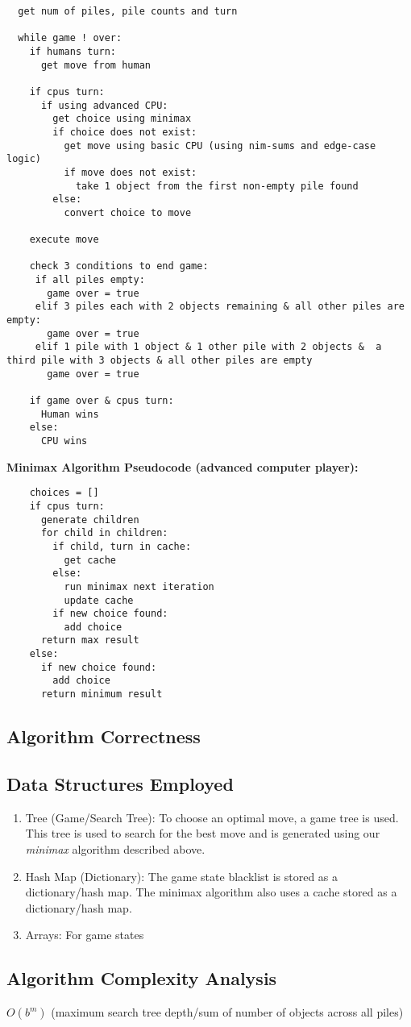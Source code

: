 \documentclass{article}
\begin{document}
\begin{verbatim}
  get num of piles, pile counts and turn
  
  while game ! over:
    if humans turn:
      get move from human
      
    if cpus turn:
      if using advanced CPU:
      	get choice using minimax
      	if choice does not exist:
      	  get move using basic CPU (using nim-sums and edge-case logic)
      	  if move does not exist:
      	    take 1 object from the first non-empty pile found
      	else:
      	  convert choice to move
      	  
    execute move
      
    check 3 conditions to end game:
     if all piles empty:
       game over = true
     elif 3 piles each with 2 objects remaining & all other piles are empty:
       game over = true
     elif 1 pile with 1 object & 1 other pile with 2 objects &  a third pile with 3 objects & all other piles are empty
       game over = true
       
    if game over & cpus turn:
      Human wins
    else:
      CPU wins
\end{verbatim}

\textbf{Minimax Algorithm Pseudocode (advanced computer player): }
\begin{verbatim}
    choices = []
    if cpus turn: 
      generate children
      for child in children:
        if child, turn in cache:
          get cache
        else:
          run minimax next iteration
          update cache
        if new choice found:
          add choice
      return max result
    else:
      if new choice found:
        add choice
      return minimum result
\end{verbatim}

\subsection*{Algorithm Correctness}

\subsection*{Data Structures Employed}
\begin{enumerate}
  \item Tree (Game/Search Tree): To choose an optimal move, a game tree is used. This tree is used to search for the best move and is generated using our \textit{minimax} algorithm described above. 
  \item Hash Map (Dictionary): The game state blacklist is stored as a dictionary/hash map. The minimax algorithm also uses a cache stored as a dictionary/hash map. 
  \item Arrays: For game states
\end{enumerate}
\subsection*{Algorithm Complexity Analysis}
$O(b^m)$
(maximum search tree depth/sum of number of objects across all piles)
\end{document}
